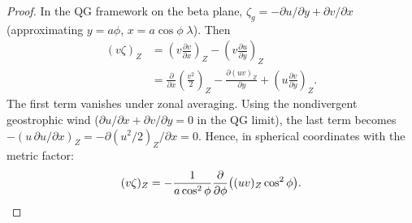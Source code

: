 \begin{proof}
In the QG framework on the beta plane, $\zeta_g = -\partial u/\partial y
+ \partial v/\partial x$ (approximating $y = a\phi$, $x = a\cos\phi\;\lambda$).
Then
\begin{align*}
  (v\zeta)_Z
  &= \left(v\frac{\partial v}{\partial x}\right)_Z
    - \left(v\frac{\partial u}{\partial y}\right)_Z \\
  &= \frac{\partial}{\partial x}\left(\frac{v^2}{2}\right)_Z
    - \frac{\partial(uv)_Z}{\partial y}
    + \left(u\frac{\partial v}{\partial y}\right)_Z.
\end{align*}
The first term vanishes under zonal averaging.
Using the nondivergent geostrophic wind ($\partial u/\partial x + \partial v/\partial y = 0$ in the QG limit),
the last term becomes $-\left(u\,\partial u/\partial x\right)_Z = -\partial(u^2/2)_Z/\partial x = 0$.
Hence, in spherical coordinates with the metric factor:
\[
  (v\zeta)_Z = -\frac{1}{a\cos^2\phi}\frac{\partial}{\partial\phi}
    \bigl((uv)_Z\cos^2\phi\bigr).\qedhere
\]
\end{proof}


